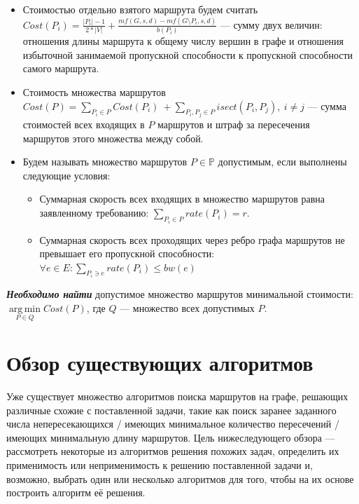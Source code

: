 \documentclass[a4paper]{article}
\DeclareMathOperator*{\argmin}{arg\,min}
\begin{document}
\begin{itemize}
\item Стоимостью отдельно взятого маршрута будем считать $Cost(P_i) = \frac{|P_i| - 1}{2*|V|} + \frac{mf(G, s, d) - mf(G \setminus P_i, s, d)}{b(P_i)}$ --- сумму двух величин: отношения длины маршрута к общему числу вершин в графе и отношения избыточной занимаемой пропускной способности к пропускной способности самого маршрута.

\item Стоимость множества маршрутов $Cost(P) = \sum\limits_{P_i\in P} Cost(P_i)\ + \sum\limits_{P_i, P_j \in P} isect(P_i, P_j),\ i \ne j$ --- сумма стоимостей всех входящих в $P$ маршрутов и штраф за пересечения маршрутов этого множества между собой.

\item Будем называть множество маршрутов $P\in \mathbb{P}$ допустимым, если выполнены следующие условия:
\begin{itemize}
\item Суммарная скорость всех входящих в множество маршрутов равна заявленному требованию: $\sum\limits_{P_i\in P} rate(P_i) = r$.
\item Суммарная скорость всех проходящих через ребро графа маршрутов не превышает его пропускной способности: $\forall e \in E: \sum\limits_{P_i \ni e} rate(P_i) \le bw(e)$
\end{itemize}
\end{itemize}

\textit{\textbf{Необходимо найти}} допустимое множество маршрутов минимальной стоимости: $\argmin\limits_{P\in Q} Cost(P)$, где $Q$ --- множество всех допустимых $P$.

\newpage
\section{Обзор существующих алгоритмов}
Уже существует множество алгоритмов поиска маршрутов на графе, решающих различные схожие с поставленной задачи, такие как поиск заранее заданного числа непересекающихся / имеющих минимальное количество пересечений / имеющих минимальную длину маршрутов. Цель нижеследующего обзора --- рассмотреть некоторые из алгоритмов решения похожих задач, определить их применимость или неприменимость к решению поставленной задачи и, возможно, выбрать один или несколько алгоритмов для того, чтобы на их основе построить алгоритм её решения.
\end{document}
